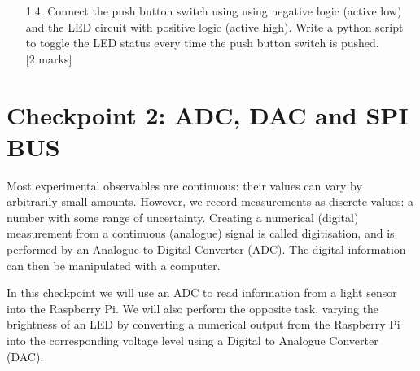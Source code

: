 \begin{enumerate}

\vspace*{-0.5cm}
\hfill [2 marks]\\


\item [1.4.]	  Connect the push button switch using  using negative logic (active low)  and the LED circuit with positive logic (active high).  Write a python script to toggle the LED status every time the push button switch is pushed. \\


\vspace*{-0.5cm}
\hfill [2 marks]\\


\end{enumerate}



\newpage
\section{Checkpoint 2: ADC, DAC and SPI BUS}

Most experimental observables are continuous: their values can vary by arbitrarily small amounts.
However, we record measurements as discrete values: a number with some range of uncertainty.
Creating a numerical (digital) measurement from a continuous (analogue) signal is called digitisation, and is performed by an Analogue to Digital Converter (ADC).
The digital information can then be manipulated with a computer.

In this checkpoint we will use an ADC to read information from a light sensor into the Raspberry Pi.
We will also perform the opposite task, varying the brightness of an LED by converting a numerical output from the Raspberry Pi into the corresponding voltage level using a Digital to Analogue Converter (DAC).

